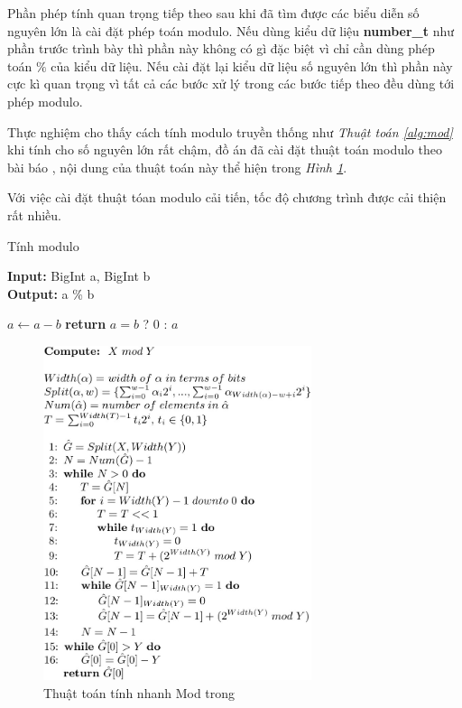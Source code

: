Phần phép tính quan trọng tiếp theo sau khi đã tìm được các biểu diễn số nguyên lớn là cài đặt phép toán modulo. Nếu dùng kiểu dữ liệu \textbf{number\_t} 
như phần trước trình bày thì phần này không có gì đặc biệt vì chỉ cần dùng phép toán $\%$ của kiểu dữ liệu. Nếu cài đặt lại kiểu dữ liệu số nguyên lớn thì phần này cực kì quan trọng vì tất cả các bước xử lý trong các bước tiếp theo đều dùng tới phép modulo.

Thực nghiệm cho thấy cách tính modulo truyền thống như \textit{Thuật toán \ref{alg:mod}} khi tính cho số nguyên lớn rất chậm, 
đồ án đã cài đặt thuật toán modulo theo bài báo \cite{Will14computingmod}, nội dung của thuật toán này thể hiện trong  \textit{Hình \ref{fig:modwithoutmod}}.

Với việc cài đặt thuật tóan modulo cải tiến, tốc độ chương trình được cải thiện rất nhiều.
\newpage
\begin{algorithm}
\caption{Tính modulo}\label{alg:mod}
\hspace*{\algorithmicindent} \textbf{Input:} BigInt a, BigInt b\\
\hspace*{\algorithmicindent} \textbf{Output:} a \% b
\begin{algorithmic}[1]
\State $a\gets a - b$
\EndWhile\label{euclidendwhile}
\State \textbf{return} $a = b $ ? 0 : $a$
\EndProcedure
\end{algorithmic}
\end{algorithm}

\begin{figure}[!h]
    \centering
    \includegraphics[width=0.7\textwidth]{image/mod_without_mod.PNG}
	\centering
	\caption{\label{fig:modwithoutmod} Thuật toán tính nhanh Mod trong \cite{Will14computingmod}}
\end{figure}


